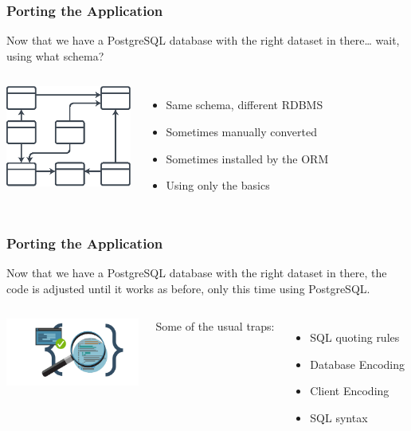 \documentclass[xcolor=dvipsnames]{beamer}
\begin{document}
\begin{frame}[fragile]
  \frametitle{Porting the Application}

  Now that we have a PostgreSQL database with the right dataset in there…
  wait, using what schema?

  \vfill
  
  \begin{columns}[c]
    \begin{center}
      \includegraphics[height=9em]{dbschema.eps}
    \end{center}

    \begin{itemize}
    \item Same schema, different RDBMS
    \item Sometimes manually converted
    \item Sometimes installed by the ORM
    \item Using only the basics
    \end{itemize}
  \end{columns}
\end{frame}

\begin{frame}[fragile]
  \frametitle{Porting the Application}

  Now that we have a PostgreSQL database with the right dataset in there,
  the code is adjusted until it works as before, only this time using
  PostgreSQL.

  \vfill
  
  \begin{columns}[c]
    \includegraphics[height=6em]{editing-your-code.png}

    Some of the usual traps:
    
    \begin{itemize}
    \item SQL quoting rules
    \item Database Encoding
    \item Client Encoding
    \item SQL syntax
    \end{itemize}
  \end{columns}
\end{frame}
\end{document}
